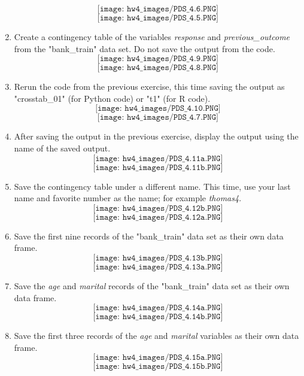 \documentclass[11pt]{article}
\theoremstyle{definition}
\newcommand{\1}[1]{\mathbf{1} \left \{ #1 \right \}}
\begin{document}
\begin{enumerate}
    \[\texttt{[image: hw4\_images/PDS\_4.6.PNG]}\]
    \[\texttt{[image: hw4\_images/PDS\_4.5.PNG]}\]
    \item Create a contingency table of the variables \textit{response} and \textit{previous\_outcome} from the "bank\_train" data set. Do not save the output from the code.
    \[\texttt{[image: hw4\_images/PDS\_4.9.PNG]}\]
    \[\texttt{[image: hw4\_images/PDS\_4.8.PNG]}\]
    \item Rerun the code from the previous exercise, this time saving the output as "crosstab\_01" (for Python code) or "t1" (for R code).
    \[\texttt{[image: hw4\_images/PDS\_4.10.PNG]}\]
    \[\texttt{[image: hw4\_images/PDS\_4.7.PNG]}\]
    \item After saving the output in the previous exercise, display the output using the name of the saved output.
    \[\texttt{[image: hw4\_images/PDS\_4.11a.PNG]}\]
    \[\texttt{[image: hw4\_images/PDS\_4.11b.PNG]}\]
    \item Save the contingency table under a different name. This time, use your last name and favorite number as the name; for example \textit{thomas4}.
    \[\texttt{[image: hw4\_images/PDS\_4.12b.PNG]}\]
    \[\texttt{[image: hw4\_images/PDS\_4.12a.PNG]}\]
    \item Save the first nine records of the "bank\_train" data set as their own data frame.
    \[\texttt{[image: hw4\_images/PDS\_4.13b.PNG]}\]
    \[\texttt{[image: hw4\_images/PDS\_4.13a.PNG]}\]
    \item Save the \textit{age} and \textit{marital} records of the "bank\_train" data set as their own data frame.
    \[\texttt{[image: hw4\_images/PDS\_4.14a.PNG]}\]
    \[\texttt{[image: hw4\_images/PDS\_4.14b.PNG]}\]
    \item Save the first three records of the \textit{age} and \textit{marital} variables as their own data frame.
    \[\texttt{[image: hw4\_images/PDS\_4.15a.PNG]}\]
    \[\texttt{[image: hw4\_images/PDS\_4.15b.PNG]}\]
\end{enumerate}
\end{document}
